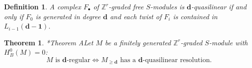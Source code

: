 \documentclass[11pt,reqno]{amsart}
\newtheorem{theorem}[lemma]{Theorem}
\newtheorem{defn}[lemma]{Definition}
\theoremstyle{remark}
\newcommand{\dd}{\mathbf d}
\newcommand{\one}{\mathbf 1}
\newcommand{\K}{\mathbb{K}}
\renewcommand{\P}{\mathbb{P}}
\newcommand{\Z}{\mathbb{Z}}
\renewcommand{\cite}[1]{{}}
\begin{document}
\begin{defn}
A complex $F_{\bullet}$ of $\Z^{r}$-graded free $S$-modules is $\dd$-quasilinear if and only if $F_{0}$ is generated in degree $\dd$ and each twist of $F_{i}$ is contained in $L_{i-1}(\dd-\one)$.
\end{defn}

%

\begin{theorem}\cite{bruceHellerSayrafi21}*{Theorem A}\label{thm:mgreg-main}
Let $M$ be a finitely generated $\Z^{r}$-graded $S$-module with $H^{0}_{B}(M)=0$:
\[
\text{$M$ is $\dd$-regular} \iff  \text{$M_{\geq\dd}$ has a $\dd$-quasilinear resolution}.
\]
\end{theorem}
\end{document}
